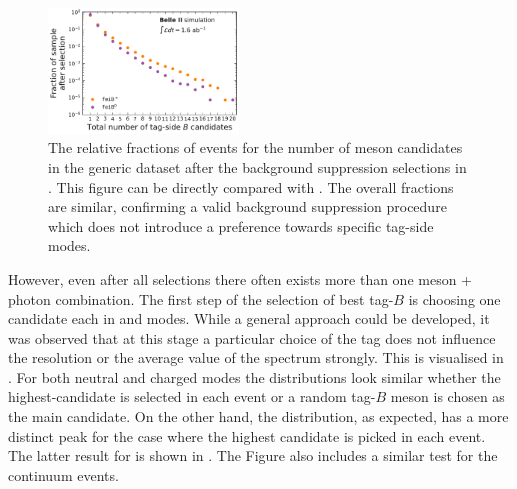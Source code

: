 \begin{figure}[htbp!]
    \centering
    \includegraphics[width=0.45\textwidth]{figures/best_tag_selection/Bboth_total_tag_candidates_post_optimisation.pdf}
    \caption{\label{fig:fei_tag_reco_candidates_post_optimisation} 
    The relative fractions of events for the number of \B meson candidates in the generic \MC dataset after the background suppression selections in .
    This figure can be directly compared with .
    The overall fractions are similar, confirming a valid background suppression procedure which does not introduce a preference towards specific tag-side modes.
    }
\end{figure}

However, even after all selections there often exists more than one \B meson + photon combination.
The first step of the selection of best tag-$B$ is choosing one candidate each in \feiBp and \feiBz modes.
While a general approach could be developed, it was observed that at this stage a particular choice of the tag does not influence the resolution or the average value of the spectrum strongly.
This is visualised in .
For both neutral and charged \BtoXsgamma modes the distributions look similar whether the highest-\feiProb candidate is selected in each event or a random tag-$B$ meson is chosen as the main candidate.
On the other hand, the \Mbc distribution, as expected, has a more distinct peak for the case where the highest \feiProb candidate is picked in each event.
The latter result for \BtoXsgamma is shown in .
The Figure also includes a similar \Mbc test for the continuum events.

